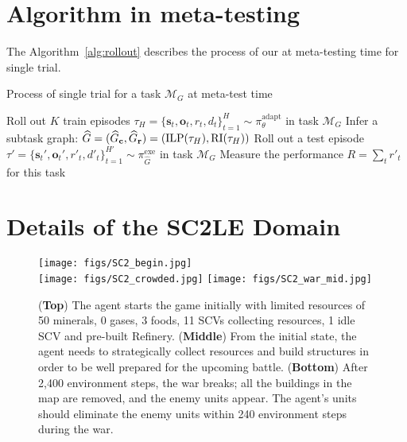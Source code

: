 \documentclass{article} \usepackage{iclr2020_conference,times}
\newcommand{\GChat}{{\smash{\widehat{G}_{\mb{c}}}}}
\newcommand{\GRhat}{{\smash{\widehat{G}_{\mb{r}}}}}
\newcommand{\mb}{\mathbf}
\newcommand{\tb}{\textbf}
\newcommand{\mc}{\mathcal}
\begin{document}
\section{Algorithm in meta-testing}
\label{sec:algo_rollout}
The Algorithm~\ref{alg:rollout} describes the process of our \NSGI{} at meta-testing time for single trial.
\begin{algorithm}[!h]
\caption{ Process of single trial for a task $\mc{M}_{G}$ at meta-test time} \label{alg:rollout}
\begin{algorithmic}[1]
    \State Roll out $K$ train episodes $\tau_H=\{\mb{s}_t, \mb{o}_t, r_t, d_t\}_{t=1}^{H} \sim \pi^{\text{adapt}}_{\theta}$ in task $\mc{M}_{G}$ 
    \State Infer a subtask graph: $\widehat{G} = (\GChat{}, \GRhat{})=\left(\text{ILP}( \tau_H ), \text{RI}( \tau_H ) \right)$ 
    \State Roll out a test episode $\tau'=\{\mb{s}_t', \mb{o}_t',r'_t, d'_t\}_{t=1}^{H'}\sim \pi^{\text{exe}}_{\widehat{G}}$ in task $\mc{M}_{G}$ 
    \State Measure the performance $R = \sum_{t}{ r'_t }$ for this task
\end{algorithmic}
\end{algorithm}

\section{Details of the SC2LE Domain}
\label{sec:appendix_sc2domain}

\begin{figure}[!b]
    \centering
    \texttt{[image: figs/SC2\_begin.jpg]}\\
    \texttt{[image: figs/SC2\_crowded.jpg]}
    \texttt{[image: figs/SC2\_war\_mid.jpg]}
    \caption{(\tb{Top}) The agent starts the game initially with limited resources of 50 minerals, 0 gases, 3 foods,
    11 SCVs collecting resources, 1 idle SCV and pre-built Refinery.
    (\tb{Middle})
    From the initial state, the agent needs to strategically collect resources and
    build structures in order to be well prepared for the upcoming battle. 
    (\tb{Bottom}) After 2,400 environment steps, the war breaks; all the buildings in the map are removed, and the enemy units appear. The agent's units should eliminate the enemy units within 240 environment steps during the war. }
    \label{fig:sc2_example}
\end{figure}
\end{document}
